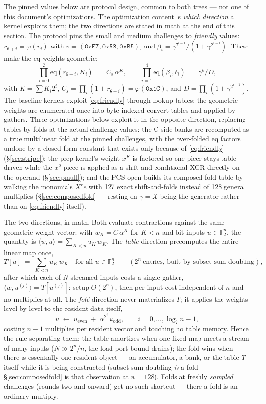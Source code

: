 \documentclass[11pt]{article}
\newcommand{\Ftwo}{\mathbb{F}_2}
\newcommand{\eq}{\mathrm{eq}}
\begin{document}
The pinned values below are protocol design, common to both trees --- not
one of this document's optimizations. The optimization content is
\emph{which direction} a kernel exploits them; the two directions are
stated in math at the end of this section.
The protocol pins the small and medium challenges to \emph{friendly} values:
$r_{6+i} = \varphi(v_i)$ with $v=(\mathtt{0xF7},\mathtt{0x53},\mathtt{0xB5})$,
and $\beta_i = \gamma^{2^{i-1}}/(1+\gamma^{2^{i-1}})$. These make the eq
weights geometric:
\begin{equation}
\prod_{i=0}^{2}\eq(r_{6+i},K_i) \;=\; C_s\,\alpha^{K},
\qquad
\prod_{i=1}^{4}\eq(\beta_i,b_i) \;=\; \gamma^{b}/D,
\label{eq:friendly}
\end{equation}
with $K=\sum K_i 2^i$, $C_s=\prod_i(1+r_{6+i})=\varphi(\mathtt{0x1C})$, and
$D=\prod_i(1+\gamma^{2^{i-1}})$. The baseline kernels exploit
\eqref{eq:friendly} through lookup tables: the geometric weights are
enumerated once into byte-indexed convert tables and applied by gathers.
Three optimizations below exploit it in the opposite direction, replacing
tables by folds at the actual challenge values: the C-side banks are
recomputed as a true multilinear fold at the pinned challenges, with the
over-folded eq factors undone by a closed-form constant that exists only
because of \eqref{eq:friendly} (\S\ref{sec:stripe}); the prep kernel's
weight $x^K$ is factored so one piece stays table-driven while the $x^2$
piece is applied as a shift-and-conditional-XOR directly on the operand
(\S\ref{sec:pmull}); and the PCS open builds its composed fold table by
walking the monomials $X^r e$ with 127 exact shift-and-folds instead of 128
general multiplies (\S\ref{sec:composedfold} --- resting on $\gamma = X$
being the generator rather than on \eqref{eq:friendly} itself).

The two directions, in math. Both evaluate contractions against the same
geometric weight vector: with $w_K = C\,\alpha^K$ for $K < n$ and
bit-inputs $u \in \Ftwo^n$, the quantity is
$\langle w, u\rangle = \sum_{K<n} u_K\, w_K$. The \emph{table} direction
precomputes the entire linear map once,
\[
T[u] \;=\; \sum_{K<n} u_K\, w_K
\quad\text{for all } u\in\Ftwo^{n}
\qquad(2^{n}\ \text{entries, built by subset-sum doubling}),
\]
after which each of $N$ streamed inputs costs a single gather,
$\langle w, u^{(j)}\rangle = T[u^{(j)}]$: setup $O(2^{n})$, then per-input
cost independent of $n$ and no multiplies at all. The \emph{fold}
direction never materializes $T$; it applies the weights level by level
to the resident data itself,
\[
u \;\leftarrow\; u_{\mathrm{even}} \;+\; \alpha^{2^{i}}\, u_{\mathrm{odd}},
\qquad i = 0,\dots,\log_2 n - 1,
\]
costing $n-1$ multiplies per resident vector and touching no table
memory. Hence the rule separating them: the table amortizes when one
fixed map meets a stream of many inputs ($N \gg 2^{n}/n$, the
load-port-bound drains); the fold wins when there is essentially one
resident object --- an accumulator, a bank, or the table $T$ itself while
it is being constructed (subset-sum doubling \emph{is} a fold;
\S\ref{sec:composedfold} is that observation at $n=128$). Folds at
freshly \emph{sampled} challenges (rounds two and onward) get no such
shortcut --- there a fold is an ordinary multiply.
\end{document}
